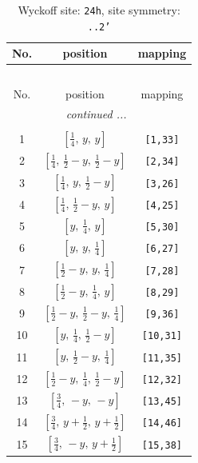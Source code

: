 \documentclass[fleqn,8pt]{jsarticle}
\begin{document}
\begin{longtable}{ccc}
\caption{Wyckoff site: {\tt 24h}, site symmetry: {\tt ..2'}}
 \\
 \hline \hline
No. & position & mapping \\ \hline \endfirsthead

\multicolumn{2}{l}{\tablename\ \thetable{}} \\
 \hline \hline
No. & position & mapping \\ \hline \endhead

 \hline \hline
\multicolumn{2}{r}{\footnotesize\it continued ...} \\ \endfoot

 \hline \hline
\multicolumn{2}{r}{} \\ \endlastfoot

1 & $\left[ \frac{1}{4},\, y,\, y \right]$ & {\tt [1,33]} \\ \hline
2 & $\left[ \frac{1}{4},\, \frac{1}{2} - y,\, \frac{1}{2} - y \right]$ & {\tt [2,34]} \\ \hline
3 & $\left[ \frac{1}{4},\, y,\, \frac{1}{2} - y \right]$ & {\tt [3,26]} \\ \hline
4 & $\left[ \frac{1}{4},\, \frac{1}{2} - y,\, y \right]$ & {\tt [4,25]} \\ \hline
5 & $\left[ y,\, \frac{1}{4},\, y \right]$ & {\tt [5,30]} \\ \hline
6 & $\left[ y,\, y,\, \frac{1}{4} \right]$ & {\tt [6,27]} \\ \hline
7 & $\left[ \frac{1}{2} - y,\, y,\, \frac{1}{4} \right]$ & {\tt [7,28]} \\ \hline
8 & $\left[ \frac{1}{2} - y,\, \frac{1}{4},\, y \right]$ & {\tt [8,29]} \\ \hline
9 & $\left[ \frac{1}{2} - y,\, \frac{1}{2} - y,\, \frac{1}{4} \right]$ & {\tt [9,36]} \\ \hline
10 & $\left[ y,\, \frac{1}{4},\, \frac{1}{2} - y \right]$ & {\tt [10,31]} \\ \hline
11 & $\left[ y,\, \frac{1}{2} - y,\, \frac{1}{4} \right]$ & {\tt [11,35]} \\ \hline
12 & $\left[ \frac{1}{2} - y,\, \frac{1}{4},\, \frac{1}{2} - y \right]$ & {\tt [12,32]} \\ \hline
13 & $\left[ \frac{3}{4},\, - y,\, - y \right]$ & {\tt [13,45]} \\ \hline
14 & $\left[ \frac{3}{4},\, y + \frac{1}{2},\, y + \frac{1}{2} \right]$ & {\tt [14,46]} \\ \hline
15 & $\left[ \frac{3}{4},\, - y,\, y + \frac{1}{2} \right]$ & {\tt [15,38]} \\ \hline

\end{longtable}
\end{document}
